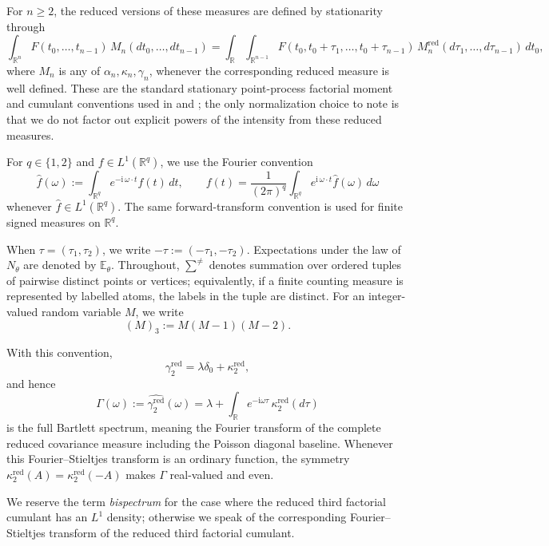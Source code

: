 \documentclass[aap,press]{apt} \volno{00} \partno{00}
\newcommand{\E}{\mathbb{E}}
\newcommand{\R}{\mathbb{R}}
\renewcommand{\ii}{\mathrm{i}}
\newcommand{\1}{\mathbf{1}}
\numberwithin{equation}{section}
\begin{document}
For $n\ge2$, the reduced versions of these measures are defined by stationarity through
\[
\int_{\R^n} F(t_0,\dots,t_{n-1})\,M_n(dt_0,\dots,dt_{n-1})
=
\int_\R\int_{\R^{n-1}}
F(t_0,t_0+\tau_1,\dots,t_0+\tau_{n-1})\,
M_n^{\mathrm{red}}(d\tau_1,\dots,d\tau_{n-1})\,dt_0,
\]
where $M_n$ is any of $\alpha_n,\kappa_n,\gamma_n$, whenever the corresponding reduced measure is well defined. These are the standard stationary point-process factorial moment and cumulant conventions used in \cite{Brillinger1975} and \cite{daley2003introduction}; the only normalization choice to note is that we do not factor out explicit powers of the intensity from these reduced measures.

For $q\in\{1,2\}$ and $f\in L^1(\R^q)$, we use the Fourier convention
\[
\widehat f(\omega):=\int_{\R^q} e^{-\ii\,\omega\cdot t}f(t)\,dt,
\qquad
f(t)=\frac{1}{(2\pi)^q}\int_{\R^q} e^{\ii\,\omega\cdot t}\widehat f(\omega)\,d\omega
\]
whenever $\widehat f\in L^1(\R^q)$. The same forward-transform convention is used for finite signed measures on $\R^q$.

When $\tau=(\tau_1,\tau_2)$, we write $-\tau:=(-\tau_1,-\tau_2)$. Expectations under the law of $N_\theta$ are denoted by $\E_\theta$. Throughout, $\sum^{\neq}$ denotes summation over ordered tuples of pairwise distinct points or vertices; equivalently, if a finite counting measure is represented by labelled atoms, the labels in the tuple are distinct. For an integer-valued random variable \(M\), we write
\[
(M)_3:=M(M-1)(M-2).
\]

With this convention,
\[
\gamma_2^{\mathrm{red}}=\lambda\delta_0+\kappa_2^{\mathrm{red}},
\]
and hence
\[
\Gamma(\omega):=\widehat{\gamma_2^{\mathrm{red}}}(\omega)
=\lambda+\int_\R e^{-\ii\omega\tau}\,\kappa_2^{\mathrm{red}}(d\tau)
\]
is the full Bartlett spectrum, meaning the Fourier transform of the complete reduced covariance measure including the Poisson diagonal baseline. Whenever this Fourier--Stieltjes transform is an ordinary function, the symmetry $\kappa_2^{\mathrm{red}}(A)=\kappa_2^{\mathrm{red}}(-A)$ makes $\Gamma$ real-valued and even.

We reserve the term \emph{bispectrum} for the case where the reduced third factorial cumulant has an $L^1$ density; otherwise we speak of the corresponding Fourier--Stieltjes transform of the reduced third factorial cumulant.
\end{document}
